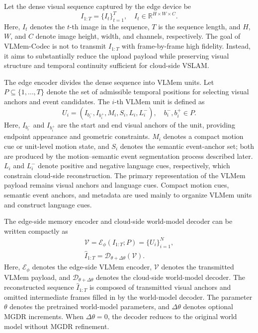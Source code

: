 \documentclass[journal]{IEEEtran}
\begin{document}
Let the dense visual sequence captured by the edge device be
\begin{equation}
I_{1:T}=\{I_t\}_{t=1}^{T},\quad
I_t\in \mathbb{R}^{H\times W\times C}.
\label{eq:dense_stream}
\end{equation}
Here, \(I_t\) denotes the \(t\)-th image in the sequence, \(T\) is the sequence length, and \(H\), \(W\), and \(C\) denote image height, width, and channels, respectively. The goal of VLMem-Codec is not to transmit \(I_{1:T}\) with frame-by-frame high fidelity. Instead, it aims to substantially reduce the upload payload while preserving visual structure and temporal continuity sufficient for cloud-side VSLAM.

The edge encoder divides the dense sequence into VLMem units. Let \(P\subseteq\{1,\ldots,T\}\) denote the set of admissible temporal positions for selecting visual anchors and event candidates. The \(i\)-th VLMem unit is defined as
\begin{equation}
U_i=\left(I_{b_i^-}, I_{b_i^+}, M_i, S_i, L_i, L_i^-\right),
\quad b_i^-, b_i^+\in P.
\label{eq:vl_memory_unit}
\end{equation}
Here, \(I_{b_i^-}\) and \(I_{b_i^+}\) are the start and end visual anchors of the unit, providing endpoint appearance and geometric constraints. \(M_i\) denotes a compact motion cue or unit-level motion state, and \(S_i\) denotes the semantic event-anchor set; both are produced by the motion--semantic event segmentation process described later. \(L_i\) and \(L_i^-\) denote positive and negative language cues, respectively, which constrain cloud-side reconstruction. The primary representation of the VLMem payload remains visual anchors and language cues. Compact motion cues, semantic event anchors, and metadata are used mainly to organize VLMem units and construct language cues.

The edge-side memory encoder and cloud-side world-model decoder can be written compactly as
\begin{equation}
\begin{gathered}
\mathcal{V}=\mathcal{E}_{\phi}(I_{1:T};P)=\{U_i\}_{i=1}^{N},\\
\hat{I}_{1:T}=\mathcal{D}_{\theta+\Delta\theta}(\mathcal{V}).
\end{gathered}
\label{eq:memory_coding}
\end{equation}
Here, \(\mathcal{E}_{\phi}\) denotes the edge-side VLMem encoder, \(\mathcal{V}\) denotes the transmitted VLMem payload, and \(\mathcal{D}_{\theta+\Delta\theta}\) denotes the cloud-side world-model decoder. The reconstructed sequence \(\hat{I}_{1:T}\) is composed of transmitted visual anchors and omitted intermediate frames filled in by the world-model decoder. The parameter \(\theta\) denotes the pretrained world-model parameters, and \(\Delta\theta\) denotes optional MGDR increments. When \(\Delta\theta=0\), the decoder reduces to the original world model without MGDR refinement.
\end{document}
